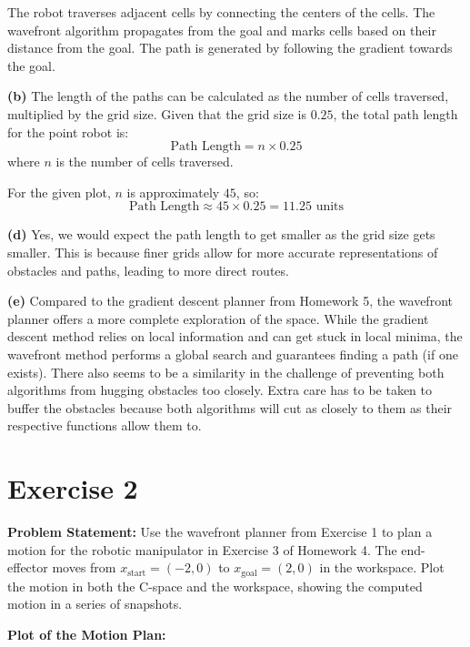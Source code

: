\documentclass{article}
\begin{document}
The robot traverses adjacent cells by connecting the centers of the cells. The wavefront algorithm propagates from the goal and marks cells based on their distance from the goal. The path is generated by following the gradient towards the goal.

\textbf{(b)} The length of the paths can be calculated as the number of cells traversed, multiplied by the grid size. Given that the grid size is $0.25$, the total path length for the point robot is:
\[
\text{Path Length} = n \times 0.25
\]
where $n$ is the number of cells traversed.

For the given plot, $n$ is approximately \(45\), so:
\[
\text{Path Length} \approx 45 \times 0.25 = 11.25 \text{ units}
\]

\textbf{(d)} Yes, we would expect the path length to get smaller as the grid size gets smaller. This is because finer grids allow for more accurate representations of obstacles and paths, leading to more direct routes.

\textbf{(e)} Compared to the gradient descent planner from Homework 5, the wavefront planner offers a more complete exploration of the space. While the gradient descent method relies on local information and can get stuck in local minima, the wavefront method performs a global search and guarantees finding a path (if one exists). There also seems to be a similarity in the challenge of preventing both algorithms from hugging obstacles too closely. Extra care has to be taken to buffer the obstacles because both algorithms will cut as closely to them as their respective functions allow them to.
    

\section{Exercise 2}
\textbf{Problem Statement:} Use the wavefront planner from Exercise 1 to plan a motion for the robotic manipulator in Exercise 3 of Homework 4. The end-effector moves from \( x_{\text{start}} = (-2, 0) \) to \( x_{\text{goal}} = (2, 0) \) in the workspace. Plot the motion in both the C-space and the workspace, showing the computed motion in a series of snapshots.

\textbf{Plot of the Motion Plan:}
\end{document}
